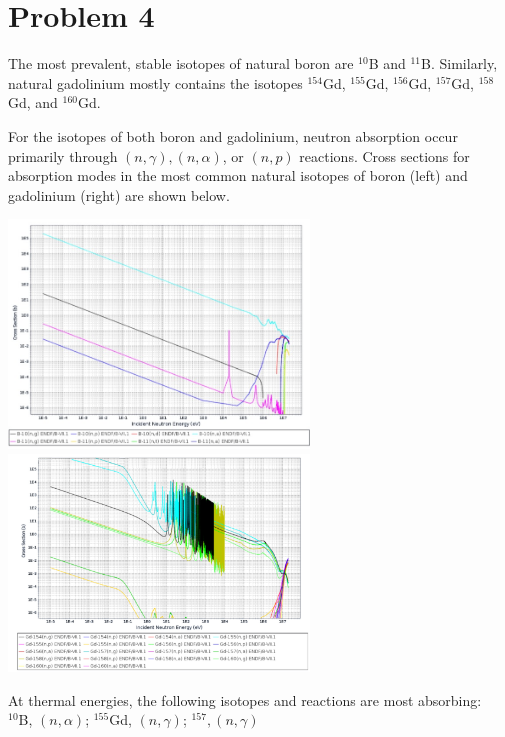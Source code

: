 \documentclass{article}
\begin{document}

\section*{Problem 4}

The most prevalent, stable isotopes of natural boron are $^{10}$B and $^{11}$B. Similarly, natural gadolinium mostly contains the isotopes $^{154}$Gd, $^{155}$Gd, $^{156}$Gd, $^{157}$Gd, $^{158}$Gd, and $^{160}$Gd.

For the isotopes of both boron and gadolinium, neutron absorption occur primarily through $(n,\gamma),(n,\alpha)$, or $(n,p)$ reactions. Cross sections for absorption modes in the most common natural isotopes of boron (left) and gadolinium (right) are shown below.

\begin{multicols}{2}
\includegraphics[width=8cm]{B_xs_abs}
\includegraphics[width=8cm]{Gd_xs_abs}
\end{multicols}

At thermal energies, the following isotopes and reactions are most absorbing:\\
$^{10}$B, $(n,\alpha)$; $^{155}$Gd, $(n,\gamma)$; $^{157}$$, (n,\gamma)$\\
\end{document}
